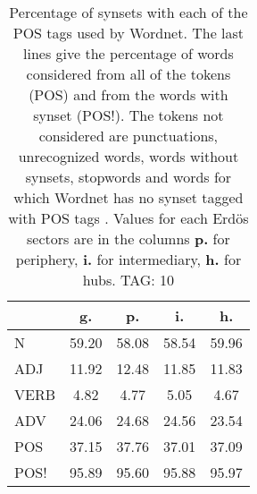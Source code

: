 \begin{table}[h!]
\begin{center}
\begin{tabular}{| l | c | c | c | c |}\hline
 & g. & p. & i. & h. \\\hline
N & 59.20  & 58.08  & 58.54  & 59.96 \\\hline
ADJ & 11.92  & 12.48  & 11.85  & 11.83 \\\hline
VERB & 4.82  & 4.77  & 5.05  & 4.67 \\\hline
ADV & 24.06  & 24.68  & 24.56  & 23.54 \\\hline
POS & 37.15  & 37.76  & 37.01  & 37.09 \\\hline
POS! & 95.89  & 95.60  & 95.88  & 95.97 \\\hline
\end{tabular}
\caption{Percentage of synsets with each of the POS tags used by Wordnet. The last lines give the percentage of words considered from all of the tokens (POS) and from the words with synset (POS!). The tokens not considered are punctuations, unrecognized words, words without synsets, stopwords and words for which Wordnet has no synset  tagged with POS tags . Values for each Erd\"os sectors are in the columns {{\bf p.}} for periphery, {{\bf i.}} for intermediary, {{\bf h.}} for hubs. TAG: 10}
\end{center}
\end{table}